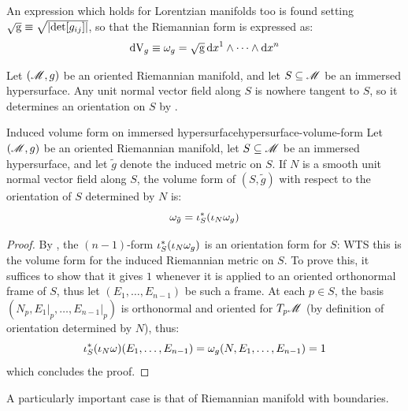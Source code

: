An expression which holds for Lorentzian manifolds too is found setting $ \sqrt{\mathrm{g}} \equiv \sqrt{\left\lvert\det [g_{ij}]\right\rvert} $, so that the Riemannian form is expressed as:
\begin{equation}
  \mathrm{d} \mathrm{V}_g \equiv \omega_g = \sqrt{\mathrm{g}} \, \mathrm{d} x^1 \wedge \dots \wedge \mathrm{d} x^n
  \label{eq:volume-form}
\end{equation}

Let $ (\mathscr{M},g) $ be an oriented Riemannian manifold, and let $ S \subseteq \mathscr{M} $ be an immersed hypersurface. Any unit normal vector field along $ S $ is nowhere tangent to $ S $, so it determines an orientation on $ S $ by .

\begin{proposition}{Induced volume form on immersed hypersurface}{hypersurface-volume-form}
  Let $ (\mathscr{M},g) $ be an oriented Riemannian manifold, let $ S \subseteq \mathscr{M} $ be an immersed hypersurface, and let $ \tilde{g} $ denote the induced metric on $ S $. If $ N $ is a smooth unit normal vector field along $ S $, the volume form of $ (S,\tilde{g}) $ with respect to the orientation of $ S $ determined by $ N $ is:
  \begin{equation}
    \omega_{\tilde{g}} = \iota_S^*(\iota_N \omega_g)
  \end{equation}
\end{proposition}

\begin{proofbox}
  \begin{proof}
    By , the $ (n-1) $-form $ \iota_S^*(\iota_N \omega_g) $ is an orientation form for $ S $: WTS this is the volume form for the induced Riemannian metric on $ S $. To prove this, it suffices to show that it gives $ 1 $ whenever it is applied to an oriented orthonormal frame of $ S $, thus let $ (E_1 , \dots , E_{n-1}) $ be such a frame. At each $ p \in S $, the basis $ (N_p , E_1 \vert_p , \dots , E_{n-1} \vert_p) $ is orthonormal and oriented for $ T_p\mathscr{M} $ (by definition of orientation determined by $ N $), thus:
    \begin{equation*}
      \iota_S^*(\iota_N \omega)(E_1 , \dots , E_{n-1}) = \omega_g(N , E_1 , \dots , E_{n-1}) = 1
    \end{equation*}
    which concludes the proof.
  \end{proof}
\end{proofbox}

A particularly important case is that of Riemannian manifold with boundaries.

